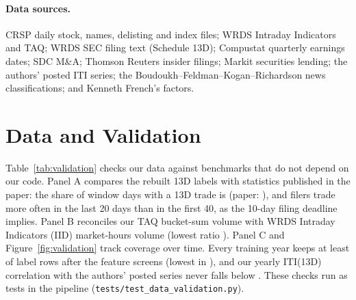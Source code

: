 \documentclass{article}
\begin{document}
\paragraph{Data sources.} CRSP daily stock, names, delisting and index files;
WRDS Intraday Indicators and TAQ; WRDS SEC filing text (Schedule 13D);
Compustat quarterly earnings dates; SDC M\&A; Thomson Reuters insider filings;
Markit securities lending; the authors' posted ITI series; the
Boudoukh--Feldman--Kogan--Richardson news classifications; and Kenneth French's
factors.

\section{Data and Validation}
Table~\ref{tab:validation} checks our data against benchmarks that do not depend
on our code. Panel A compares the rebuilt 13D labels with statistics published
in the paper: the share of window days with a 13D trade is \ItradeOurs{}
(paper: \ItradePaper{}), and filers trade more often in the last 20 days than
in the first 40, as the 10-day filing deadline implies. Panel B reconciles our
TAQ bucket-sum volume with WRDS Intraday Indicators (IID) market-hours volume
(lowest ratio \VolRatioMin{}).
Panel C and Figure~\ref{fig:validation} track coverage over time. Every
training year keeps at least \MinCoverage{} of label rows after the feature
screens (lowest in \MinCoverageYear{}), and our yearly ITI(13D) correlation with
the authors' posted series never falls below \MinPearson{}. These checks run
as tests in the pipeline (\texttt{tests/test\_data\_validation.py}).

\begin{table}[H]
\centering\small
\caption{Data validation. Rebuilt labels match the paper's trade frequency
closely, but filers' share of daily volume is about half the published figure.
Our extractor keeps small trades that the authors may have aggregated, so
our labels carry the right timing with a weaker per-day signal. Our TAQ volume
matches WRDS IID volume exactly in 2004 and is \VolRatioMin{} or more of it in 2019. Both
aggregate the same TAQ trades, so this checks our aggregation rather than the
trade data itself; the 2019 shortfall is volume printed under sale conditions
our regular/odd-lot screen excludes. Coverage and agreement with the
authors' series clear every tolerance, so differences in the downstream exhibits
do not come from a broken universe or a missing year.}
\label{tab:validation}
\resizebox{\textwidth}{!}{}
\end{table}
\end{document}
